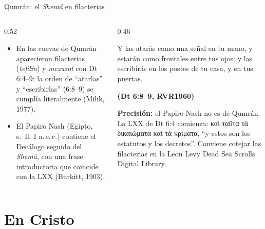 \documentclass[hyperref={bookmarks=false},aspectratio=169]{beamer}
\newcommand{\grc}[1]{\foreignlanguage{ancientgreek}{#1}}
\newcommand{\fuente}[1]{\par\hfill{\upshape\bfseries\footnotesize\textcolor{azul}{#1}}}
\newcommand{\precision}[1]{{\footnotesize\color{gris}\textbf{Precisión:} #1}}
\begin{document}
\begin{frame}{Qumrán: el \emph{Shemá} en filacterias}
\begin{columns}[t,onlytextwidth]
\begin{column}{0.52\textwidth}\small
\begin{itemize}
\item En las cuevas de Qumrán aparecieron filacterias (\emph{tefilín}) y \emph{mezuzot} con Dt 6:4--9: la orden de ``atarlas'' y ``escribirlas'' (6:8--9) se cumplía literalmente (Milik, 1977).
\item El Papiro Nash (Egipto, s.~II--I a.\,e.\,c.) contiene el Decálogo seguido del \emph{Shemá}, con una frase introductoria que coincide con la LXX (Burkitt, 1903).
\end{itemize}
\end{column}
\begin{column}{0.46\textwidth}
\begin{cita}[fontupper=\scriptsize\itshape]Y las atarás como una señal en tu mano, y estarán como frontales entre tus ojos; y las escribirás en los postes de tu casa, y en tus puertas.\fuente{(Dt 6:8--9, RVR1960)}\end{cita}
\precision{el Papiro Nash no es de Qumrán. La LXX de Dt 6:4 comienza: \grc{καὶ ταῦτα τὰ δικαιώματα καὶ τὰ κρίματα}, ``y estos son los estatutos y los decretos''. Conviene cotejar las filacterias en la Leon Levy Dead Sea Scrolls Digital Library.}
\end{column}
\end{columns}
\end{frame}

\section{En Cristo}
\end{document}
